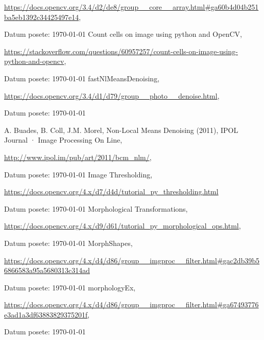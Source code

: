 \documentclass[fontsize=12bp, paper=a4]{scrarticle}
\begin{document}
\begin{thebibliography}{1}
    \url{https://docs.opencv.org/3.4/d2/de8/group__core__array.html#ga60b4d04b251ba5eb1392c34425497e14},

    Datum posete: \today
    Count cells on image using python and OpenCV,

    \url{https://stackoverflow.com/questions/60957257/count-cells-on-image-using-python-and-opencv},

    Datum posete: \today
    fastNlMeansDenoising,

    \url{https://docs.opencv.org/3.4/d1/d79/group__photo__denoise.html},
    
    Datum posete: \today

    A. Buades, B. Coll, J.M. Morel,  Non-Local Means Denoising (2011), IPOL Journal · Image Processing On Line,
    
    \url{http://www.ipol.im/pub/art/2011/bcm_nlm/},
    
    Datum posete: \today
    Image Thresholding,
    
    \url{https://docs.opencv.org/4.x/d7/d4d/tutorial_py_thresholding.html}

    Datum posete: \today
    Morphological Transformations,

    \url{https://docs.opencv.org/4.x/d9/d61/tutorial_py_morphological_ops.html},

    Datum posete: \today
    MorphShapes,

    \url{https://docs.opencv.org/4.x/d4/d86/group__imgproc__filter.html#gac2db39b56866583a95a5680313c314ad}

    Datum posete: \today
    morphologyEx,

    \url{https://docs.opencv.org/4.x/d4/d86/group__imgproc__filter.html#ga67493776e3ad1a3df63883829375201f},

    Datum posete: \today
\end{thebibliography}
\end{document}
